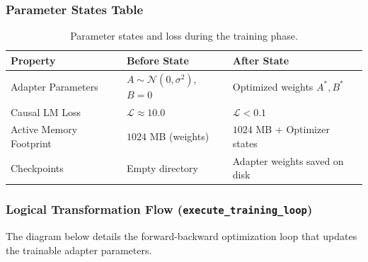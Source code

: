 \documentclass{article}
\begin{document}
\subsubsection{Parameter States Table}
\begin{table}[h]
\centering
\begin{tabular}{lll}
\toprule
\textbf{Property} & \textbf{Before State} & \textbf{After State} \\
\midrule
Adapter Parameters & $A \sim \mathcal{N}(0, \sigma^2)$, $B = 0$ & Optimized weights $A^*, B^*$ \\
Causal LM Loss & $\mathcal{L} \approx 10.0$ & $\mathcal{L} < 0.1$ \\
Active Memory Footprint & $1024$ MB (weights) & $1024$ MB + Optimizer states \\
Checkpoints & Empty directory & Adapter weights saved on disk \\
\bottomrule
\end{tabular}
\caption{Parameter states and loss during the training phase.}
\end{table}

\newpage
\subsubsection{Logical Transformation Flow (\texttt{execute\_training\_loop})}
The diagram below details the forward-backward optimization loop that updates the trainable adapter parameters.
\end{document}
